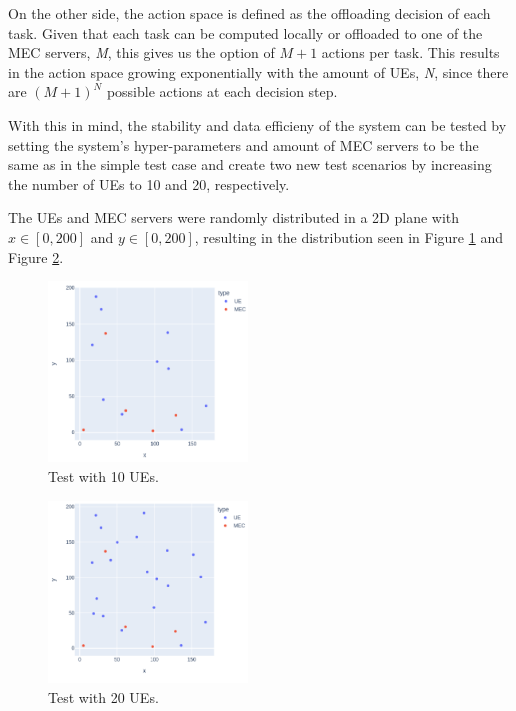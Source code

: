 On the other side, the action space is defined as the offloading decision of each task. Given that each task can be computed locally or offloaded to one of the \acrshort{MEC} servers, \emph{M}, this gives us the option of $M + 1$ actions per task. This results in the action space growing exponentially with the amount of \acrshort{UE}s, \emph{N}, since there are $(M + 1)^N$ possible actions at each decision step.

With this in mind, the stability and data efficieny of the system can be tested by setting the system's hyper-parameters and amount of \acrshort{MEC} servers to be the same as in the simple test case and create two new test scenarios by increasing the number of \acrshort{UE}s to 10 and 20, respectively.

The UEs and MEC servers were randomly distributed in a 2D plane with $x \in [0, 200]$ and $y \in [0, 200]$, resulting in the distribution seen in Figure \ref{5_10_layout} and Figure \ref{5_20_layout}.

\begin{minipage}{0.5\textwidth}
\begin{figure}[H]
  \centering
  \includegraphics[width=200px]{images/5_10_layout.png}
  \caption{Test with 10 \acrshort{UE}s.}  \label{5_10_layout}
\end{figure}
\end{minipage}
\begin{minipage}{0.5\textwidth}
\begin{figure}[H]
  \centering
  \includegraphics[width=200px]{images/5_20_layout.png}
  \caption{Test with 20 \acrshort{UE}s.}  \label{5_20_layout}
\end{figure}
\end{minipage}

